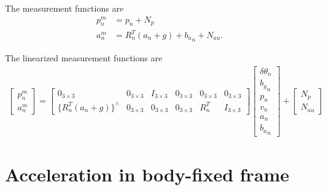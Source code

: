 \documentclass[10pt]{article}
\begin{document}
The measurement functions are
\begin{align}
	p_n^m &= p_n + N_p \\
	a_n^m &= R_n^T(a_n+g) + {b_a}_n + N_{au}.
\end{align}

The linearized measurement functions are
\begin{align}
	\begin{bmatrix} p_n^m \\ a_n^m \end{bmatrix} = \begin{bmatrix} 0_{3\times 3} & 0_{3\times 3} & I_{3\times 3} & 0_{3\times 3} & 0_{3\times 3} & 0_{3\times 3} \\ \{R_n^T(a_n+g)\}^\wedge & 0_{3\times 3} & 0_{3\times 3} & 0_{3\times 3} & R_n^T & I_{3\times 3} \end{bmatrix} \begin{bmatrix} \delta\theta_n \\ {b_g}_n \\ p_n \\ v_n \\ a_n \\ {b_a}_n \end{bmatrix} + \begin{bmatrix} N_p \\ N_{au} \end{bmatrix}
\end{align}

\section{Acceleration in body-fixed frame}
\end{document}
